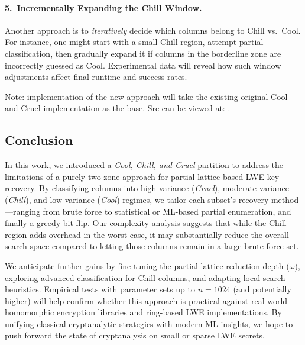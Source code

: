 \documentclass[11pt]{article}
\begin{document}
\paragraph{5.\ Incrementally Expanding the Chill Window.}
Another approach is to \emph{iteratively} decide which columns belong to Chill vs.\ Cool. For instance, one might start with a small Chill region, attempt partial classification, then gradually expand it if columns in the borderline zone are incorrectly guessed as Cool. Experimental data will reveal how such window adjustments affect final runtime and success rates.

\begingroup
Note: implementation of the new approach will take the existing original Cool and Cruel implementation as the base. Src can be viewed at: \cite{lwe-benchmarking}.
\endgroup

\subsection{Conclusion}
In this work, we introduced a \emph{Cool, Chill, and Cruel} partition to address the limitations of a purely two-zone approach for partial-lattice-based LWE key recovery. By classifying columns into high-variance (\emph{Cruel}), moderate-variance (\emph{Chill}), and low-variance (\emph{Cool}) regimes, we tailor each subset’s recovery method—ranging from brute force to statistical or ML-based partial enumeration, and finally a greedy bit-flip. Our complexity analysis suggests that while the Chill region adds overhead in the worst case, it may substantially reduce the overall search space compared to letting those columns remain in a large brute force set.

We anticipate further gains by fine-tuning the partial lattice reduction depth ($\omega$), exploring advanced classification for Chill columns, and adapting local search heuristics. Empirical tests with parameter sets up to $n=1024$ (and potentially higher) will help confirm whether this approach is practical against real-world homomorphic encryption libraries and ring-based LWE implementations. By unifying classical cryptanalytic strategies with modern ML insights, we hope to push forward the state of cryptanalysis on small or sparse LWE secrets.


  \clearpage
  
  


\newpage
\end{document}
